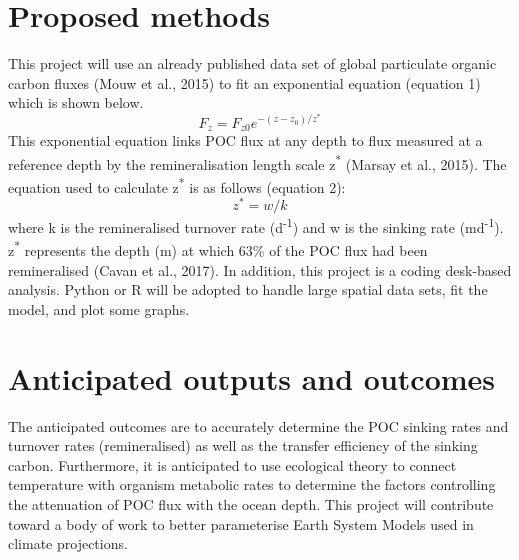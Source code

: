 \documentclass[11pt, a4paper]{article}
\begin{document}
\section{Proposed methods}
This project will use an already published data set of global particulate organic carbon fluxes (Mouw et al., 2015) to fit an exponential equation (equation 1) which is shown below.
\begin{equation}
F_z = F_{z0}e^{-(z-z_0)/z^*}
\end{equation}
This exponential equation links POC flux at any depth to flux measured at a reference depth by the remineralisation length scale z\textsuperscript{*} (Marsay et al., 2015). The equation used to calculate z\textsuperscript{*} is as follows (equation 2):
\begin{equation}
z^* = w / k
\end{equation}
where k is the remineralised turnover rate (d\textsuperscript{-1}) and w is the sinking rate (md\textsuperscript{-1}). z\textsuperscript{*} represents the depth (m) at which 63\% of the POC flux had been remineralised (Cavan et al., 2017). In addition, this project is a coding desk-based analysis. Python or R will be adopted to handle large spatial data sets, fit the model, and plot some graphs.

\section{Anticipated outputs and outcomes}
The anticipated outcomes are to accurately determine the POC sinking rates and turnover rates (remineralised) as well as the transfer efficiency of the sinking carbon. Furthermore, it is anticipated to use ecological theory to connect temperature with organism metabolic rates to determine the factors controlling the attenuation of POC flux with the ocean depth. This project will contribute toward a body of work to better parameterise Earth System Models used in climate projections.
\end{document}
